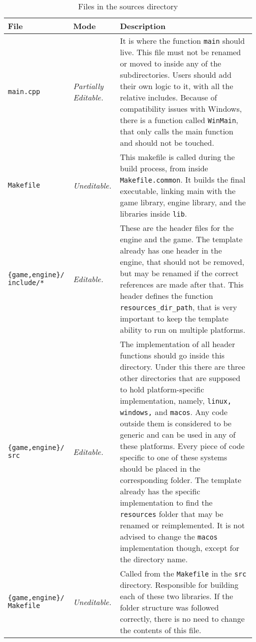 \begin{longtabu} to \linewidth {XlX[2]}

\caption{Files in the sources directory}\label{tab:files_src_dir}\\
\toprule
\textbf{File} & \textbf{Mode} & \textbf{Description} \\
\midrule
\endhead

\texttt{main.cpp} & \textit{Partially Editable.} & It is where the function \texttt{main} should live. This file must not be renamed or moved to inside any of the subdirectories. Users should add their own logic to it, with all the relative includes. Because of compatibility issues with Windows, there is a function called \texttt{WinMain}, that only calls the main function and should not be touched. \\ \hline
\texttt{Makefile} & \textit{Uneditable.} & This makefile is called during the build process, from inside \texttt{Makefile.common}. It builds the final executable, linking main with the game library, engine library, and the libraries inside \texttt{lib}. \\ \hline
\texttt{\{game,engine\}/ include/*} & \textit{Editable.} & These are the header files for the engine and the game. The template already has one header in the engine, that should not be removed, but may be renamed if the correct references are made after that. This header defines the function \texttt{resources\_dir\_path}, that is very important to keep the template ability to run on multiple platforms. \\ \hline
\texttt{\{game,engine\}/ src} & \textit{Editable.} & The implementation of all header functions should go inside this directory. Under this there are three other directories that are supposed to hold platform-specific implementation, namely, \texttt{linux, windows,} and \texttt{macos}. Any code outside them is considered to be generic and can be used in any of these platforms. Every piece of code specific to one of these systems should be placed in the corresponding folder. The template already has the specific implementation to find the \texttt{resources} folder that may be renamed or reimplemented. It is not advised to change the \texttt{macos} implementation though, except for the directory name. \\ \hline
\texttt{\{game,engine\}/ Makefile} & \textit{Uneditable.} & Called from the \texttt{Makefile} in the \texttt{src} directory. Responsible for building each of these two libraries. If the folder structure was followed correctly, there is no need to change the contents of this file. \\

\bottomrule
\end{longtabu}



